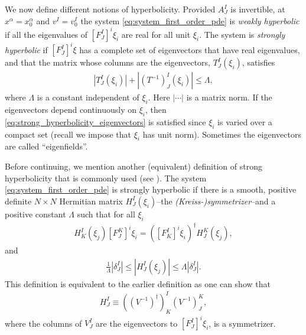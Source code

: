 \documentclass{ws-ijmpd}
\begin{document}
We now define different notions of hyperbolicity.
Provided $A^I_J$ is invertible, at $x^{\alpha}=x^{\alpha}_0$
and $v^I=v^I_0$ the system \eqref{eq:system_first_order_pde}
is \emph{weakly hyperbolic} if all the eigenvalues
of $\left[F^I_J\right]^i\xi_i$ are real for all unit $\xi_i$.
The system is \emph{strongly hyperbolic} if $\left[F^I_J\right]^i\xi$
has a complete set of eigenvectors that have real eigenvalues,
and that the matrix
whose columns are the eigenvectors, $T^I_J\left(\xi_i\right)$, satisfies
\begin{align}
\label{eq:strong_hyperbolicity_eigenvectors}
   \left| T^I_J\left(\xi_i\right)\right|
   +
   \left| \left(T^{-1}\right)^I_J\left(\xi_i\right)\right|
   \leq
   \Lambda
   ,
\end{align}
where $\Lambda$ is a constant independent of $\xi_i$.
Here $\left|\cdots\right|$ is a matrix norm.
If the eigenvectors depend continuously on $\xi_i$,
then \eqref{eq:strong_hyperbolicity_eigenvectors} is satisfied
since $\xi_i$ is varied over a compact set
(recall we impose that $\xi_i$ has unit norm).
Sometimes the eigenvectors are called 
``eigenfields''\cite{alcubierre2008introduction}.

Before continuing, we mention another (equivalent) definition of strong
hyperbolicity that is commonly used 
(see ). 
The system \eqref{eq:system_first_order_pde} is strongly hyperbolic if
there is a smooth, positive definite $N\times N$
Hermitian matrix $H^I_J(\xi_i)$--the \emph{(Kreiss-)symmetrizer}--and
a positive constant $\Lambda$ such that for all $\xi_i$
\begin{align}
   H^I_K(\xi_j) \left[F^K_J\right]^i\xi_i
   =
   \left(\left[F^I_K\right]^i\xi_i\right)^{\dagger}  H^K_J (\xi_j) 
   ,
\end{align}
and
\begin{align}
   \frac{1}{\Lambda} \left|\delta^I_J\right| 
   \leq 
   \left|H^I_J(\xi_j)\right| 
   \leq  
   \Lambda \left|\delta^I_J\right|
   .
\end{align}
This definition is equivalent to the earlier definition
as one can show that
\begin{align}
   H^I_J 
   \equiv 
   \left(\left(V^{-1}\right)^{\dagger}\right)^I_K
   \left(V^{-1}\right)^K_J, 
\end{align}
where the columns of $V^I_J$ are
the eigenvectors to $\left[F^I_J\right]^i\xi_i$, is a symmetrizer.
\end{document}
